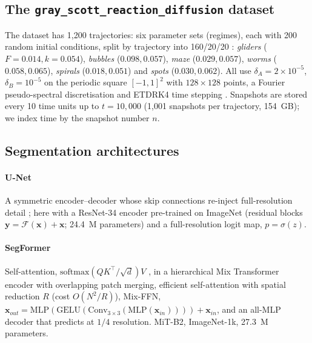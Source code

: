\documentclass[preprint,12pt,authoryear]{elsarticle}
\newcommand{\dA}{\delta_A}
\newcommand{\dB}{\delta_B}
\begin{document}
\subsection{The \texttt{gray\_scott\_reaction\_diffusion} dataset}

The dataset has 1,200 trajectories: six parameter sets (regimes), each with 200 random initial conditions, split by trajectory into 160/20/20 \citep{ohana2024well}: \emph{gliders} ($F=0.014,k=0.054$), \emph{bubbles} ($0.098,0.057$), \emph{maze} ($0.029,0.057$), \emph{worms} ($0.058,0.065$), \emph{spirals} ($0.018,0.051$) and \emph{spots} ($0.030,0.062$). All use $\dA=2\times10^{-5}$, $\dB=10^{-5}$ on the periodic square $[-1,1]^2$ with $128\times128$ points, a Fourier pseudo-spectral discretisation and ETDRK4 time stepping \citep{cox2002,kassam2005}. Snapshots are stored every 10 time units up to $t=10{,}000$ (1,001 snapshots per trajectory, 154~GB); we index time by the snapshot number $n$.

\subsection{Segmentation architectures}

\paragraph{U-Net} A symmetric encoder--decoder whose skip connections re-inject full-resolution detail \citep{ronneberger2015unet}; here with a ResNet-34 encoder pre-trained on ImageNet \citep{he2016resnet,deng2009imagenet} (residual blocks $\mathbf{y}=\mathcal{F}(\mathbf{x})+\mathbf{x}$; 24.4~M parameters) and a full-resolution logit map, $p=\sigma(z)$.

\paragraph{SegFormer} Self-attention, $\mathrm{softmax}(QK^\top/\sqrt{d})V$ \citep{vaswani2017,dosovitskiy2021vit}, in a hierarchical Mix Transformer encoder \citep{wang2021pvt,xie2021segformer} with overlapping patch merging, efficient self-attention with spatial reduction $R$ (cost $O(N^2/R)$), Mix-FFN, $\mathbf{x}_{out}=\mathrm{MLP}(\mathrm{GELU}(\mathrm{Conv}_{3\times3}(\mathrm{MLP}(\mathbf{x}_{in}))))+\mathbf{x}_{in}$, and an all-MLP decoder that predicts at $1/4$ resolution. MiT-B2, ImageNet-1k, 27.3~M parameters.
\end{document}
